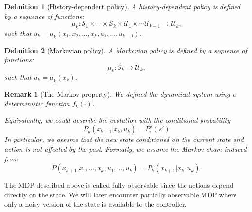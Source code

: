 \documentclass[a4 paper]{article}
\numberwithin{equation}{section}
\theoremstyle{boldStyle}
\newtheorem{remark}{Remark}[section]
\theoremstyle{boldBlueStyle}
\theoremstyle{boldPurpleStyle}
\theoremstyle{boldRedStyle}
\newtheorem{definition}{Definition}[section]
\begin{document}
\begin{definition}[History-dependent policy]
  A history-dependent policy is defined by a sequence of functions:
  \begin{equation}
    \mu_k : \mathcal{S}_1 \times \cdots \times \mathcal{S}_k \times \mathcal{U}_1 \times \cdots \mathcal{U}_{k-1} \to \mathcal{U}_k,
  \end{equation}
  such that \( u_k = \mu_k(x_1, x_2, \ldots, x_k, u_1, \ldots, u_{k-1}) \).
\end{definition}

\begin{definition}[Markovian policy]
  A Markovian policy is defined by a sequence of functions:
  \begin{equation}
    \mu_k : \mathcal{S}_k \to \mathcal{U}_k,
  \end{equation}
  such that \( u_k = \mu_k(x_k) \).
\end{definition}

\begin{remark}[The Markov property]
  We defined the dynamical system using a deterministic function \( f_k(\cdot) \). 

  Equivalently, we could describe the evolution with the conditional probability
  \begin{equation}
    P_k(x_{k+1} | x_k, u_k) = P_s^{u}(s')
  \end{equation}
  In particular, we assume that the new state conditioned on the current state and action is not affected by the past. Formally, we assume the Markov chain induced from
  \begin{equation}
    P(x_{k+1} | x_1, \ldots, x_k, u_1, \ldots, u_k) = P_k(x_{k+1} | x_k, u_k).
  \end{equation}
\end{remark}

The MDP described above is called fully observable since the actions depend directly on the state. We will later encounter partially observable MDP where only a noisy version of the state is available to the controller.




\newpage
\end{document}
